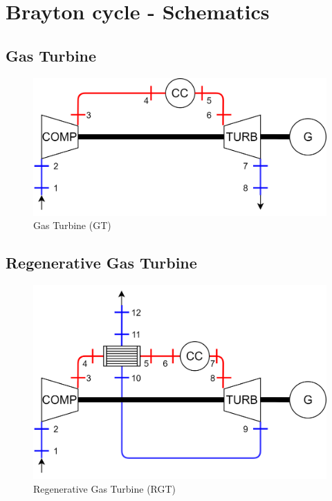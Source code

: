 \chapter{Brayton cycle - Schematics}\label{annex:Brayton_variant}
\section{Gas Turbine}
\begin{figure}[H]
    \centering
    \includegraphics[scale=0.15]{Chapitre_5/Images/GT.png}
    \caption{Gas Turbine (GT)}
    \label{fig:ann_GT}
\end{figure}

\section{Regenerative Gas Turbine}
\begin{figure}[H]
    \centering
    \includegraphics[scale=0.15]{Chapitre_5/Images/RGT.png}
    \caption{Regenerative Gas Turbine (RGT)}
    \label{fig:ann_RGT}
\end{figure}

